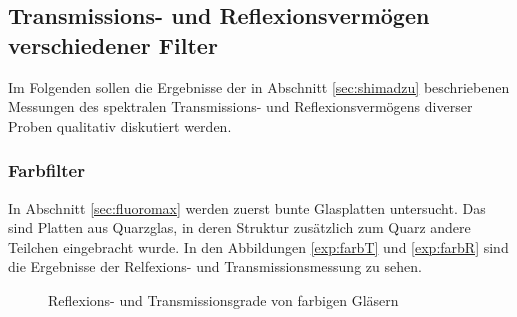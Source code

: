 \subsection{Transmissions- und Reflexionsvermögen verschiedener Filter}
	Im Folgenden sollen die Ergebnisse der in Abschnitt \ref{sec:shimadzu} beschriebenen Messungen des spektralen Transmissions- und Reflexionsvermögens diverser Proben qualitativ diskutiert werden.
    \subsubsection{Farbfilter}
        In Abschnitt \ref{sec:fluoromax} werden zuerst bunte Glasplatten untersucht. Das sind Platten aus Quarzglas, in deren Struktur zusätzlich zum Quarz andere Teilchen eingebracht wurde. In den Abbildungen \ref{exp:farbT} und \ref{exp:farbR} sind die Ergebnisse der Relfexions- und Transmissionsmessung zu sehen.
        \begin{figure}
            \caption{Reflexions- und Transmissionsgrade von farbigen Gläsern}
            \label{exp:farb}
        \end{figure}
